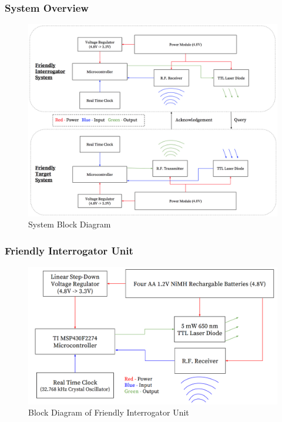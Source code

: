 \documentclass[letterpaper,10pt]{article}
\begin{document}
\begin{spacing}{1.15}
\subsubsection{System Overview}

\begin{figure} [H]
	\centering
	\includegraphics[scale=0.45]{System_Block_Diagram.png}
	\caption{System Block Diagram\label{fig:system-block-diagram}}
\end{figure}

\subsubsection{Friendly Interrogator Unit}
\begin{figure} [H]
\centering
\includegraphics[scale=0.50]{Friendly_Interrogator_Block_Diagram.png}
\caption{Block Diagram of Friendly Interrogator Unit\label{fig:friendly-interrogator-block}}
\end{figure}


\end{spacing}
\end{document}
